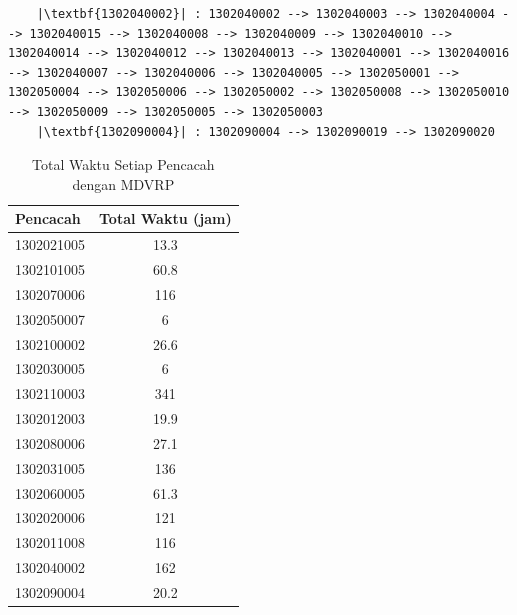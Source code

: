 \begin{listing}[!]
\begin{verbatim}
	|\textbf{1302040002}| : 1302040002 --> 1302040003 --> 1302040004 --> 1302040015 --> 1302040008 --> 1302040009 --> 1302040010 --> 1302040014 --> 1302040012 --> 1302040013 --> 1302040001 --> 1302040016 --> 1302040007 --> 1302040006 --> 1302040005 --> 1302050001 --> 1302050004 --> 1302050006 --> 1302050002 --> 1302050008 --> 1302050010 --> 1302050009 --> 1302050005 --> 1302050003
	|\textbf{1302090004}| : 1302090004 --> 1302090019 --> 1302090020
	\end{verbatim}
\end{listing}


\begin{table}[!]
	\centering
	\caption{Total Waktu Setiap Pencacah dengan MDVRP}
	\label{tbl:enumerators_total_time}
	\begin{tabular}{lc}
		\toprule
		Pencacah & Total Waktu (jam)\\
		\midrule
		1302021005 & 13.3\\
		1302101005 & 60.8\\
		1302070006 & 116\\
		1302050007 & 6\\
		1302100002 & 26.6\\
		1302030005 & 6\\
		1302110003 & 341\\
		1302012003 & 19.9\\
		1302080006 & 27.1\\
		1302031005 & 136\\
		1302060005 & 61.3\\
		1302020006 & 121\\
		1302011008 & 116\\
		1302040002 & 162\\
		1302090004 & 20.2\\
		\bottomrule
	\end{tabular}
\end{table}


